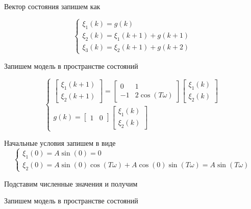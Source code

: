 Вектор состояния запишем как

\begin{equation}
	\begin{cases}
		\xi_1 (k) = g(k)\\
		\xi_2(k) = \xi_1(k+1) +g(k+1)\\
		\xi_3(k) = \xi_2(k+1) + g(k+2)
	\end{cases}
\end{equation}

Запишем модель в пространстве состояний

\begin{equation}
	\begin{cases}
		\begin{bmatrix}
			\xi_1 (k+1)\\
			\xi_2(k+1)
		\end{bmatrix} = 
		\begin{bmatrix}
			0 & 1\\
			-1 & 2 \cos(T\omega)
		\end{bmatrix}	\begin{bmatrix}
		\xi_1 (k)\\
		\xi_2(k)
		\end{bmatrix}\\
		g(k) = \begin{bmatrix}
			1 & 0
		\end{bmatrix}
			\begin{bmatrix}
			\xi_1 (k)\\
			\xi_2(k)
		\end{bmatrix}
	\end{cases}
\end{equation}

Начальные условия запишем в виде
\begin{equation}
	\begin{cases}
		\xi_1(0) = A \sin (0) = 0\\
		\xi_2 (0) = A \sin(0) \cos(T \omega) + A \cos(0) \sin(T\omega) = A \sin (T \omega)
	\end{cases}
\end{equation}


Подставим численные значения и получим

Запишем модель в пространстве состояний

